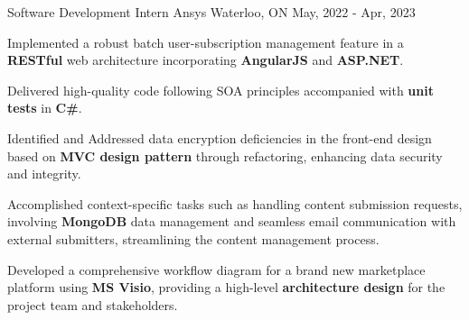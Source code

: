 

\begin{cventries}

  \cventry
	{Software Development Intern} %
	{Ansys} %
	{Waterloo, ON} %
	{May, 2022 - Apr, 2023} %
	{
		\begin{cvitems} %
			\item {Implemented a robust batch user-subscription management feature in a \textbf{RESTful} web architecture incorporating \textbf{AngularJS} and \textbf{ASP.NET}.}
			\item {Delivered high-quality code following SOA principles accompanied with \textbf{unit tests} in \textbf{C\#}.}
			\item {Identified and Addressed data encryption deficiencies in the front-end design based on \textbf{MVC design pattern} through refactoring, enhancing data security and integrity.}
			\item {Accomplished context-specific tasks such as handling content submission requests, involving \textbf{MongoDB} data management and seamless email communication with external submitters, streamlining the content management process.}
			\item {Developed a comprehensive workflow diagram for a brand new marketplace platform using \textbf{MS Visio}, providing a high-level \textbf{architecture design} for the project team and stakeholders.}
		\end{cvitems}
	}


\end{cventries}

